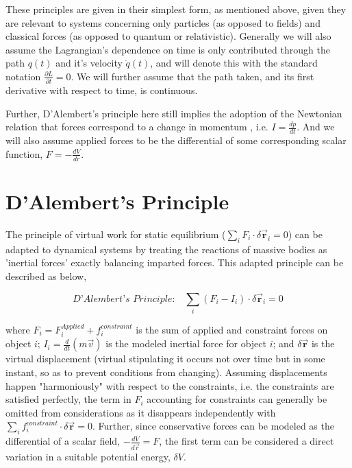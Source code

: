 \documentclass{article}\usepackage[]{graphicx}\usepackage[]{color}
\begin{document}
These principles are given in their simplest form, as mentioned above, given they are relevant to systems concerning only particles (as opposed to fields) and classical forces (as opposed to quantum or relativistic). Generally we will also assume the Lagrangian's dependence on time is only contributed through the path $q(t)$ and it's velocity $\dot{q}(t)$, and will denote this with the standard notation $\frac{\partial L}{\partial t}=0$. We will further assume that the path taken, and its first derivative with respect to time, is continuous. 

Further, D'Alembert's principle here still implies the adoption of the Newtonian relation that forces correspond to a change in momentum , i.e. $I=\frac{dp}{dt}$. And we will also assume applied forces to be the differential of some corresponding scalar function, $F=-\frac{dV}{dr}$.






\section{D'Alembert's Principle}

The principle of virtual work for static equilibrium ($\sum_i{F_i\cdot \delta \vec{\textbf{r}}_i}=0$) can be adapted to dynamical systems by treating the reactions of massive bodies as 'inertial forces' exactly balancing imparted forces. This adapted principle can be described as below,

\begin{equation}
\textit{D'Alembert's Principle:} \quad \sum_{i}{(F_{i}-I_{i})\cdot\delta \vec{\textbf{r}}_{i}}=0 
\end{equation}

where $F_i=F^{Applied}_i+f^{constraint}_{i}$ is the sum of applied and constraint forces on object $i$; $I_i=\frac{d}{dt}(m\vec{v})$ is the modeled inertial force for object $i$; and $\delta \vec{\textbf{r}}$ is the virtual displacement (virtual stipulating it occurs not over time but in some instant, so as to prevent conditions from changing). Assuming displacements happen "harmoniously" with respect to the constraints, i.e. the constraints are satisfied perfectly, the term in $F_i$ accounting for constraints can generally be omitted from considerations as it disappears independently with $\sum_i{f^{constraint}_i}\cdot\delta\vec{\textbf{r}}=0$. Further, since conservative forces can be modeled as the differential of a scalar field, $-\frac{dV}{d\vec{r}}=F$, the first term can be considered a direct variation in a suitable potential energy, $\delta V$.
\end{document}
